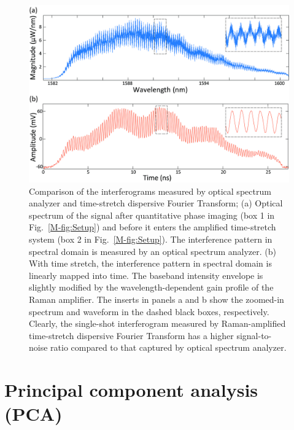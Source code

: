 \documentclass[aps,pra,reprint,longbibliography,groupedaddress]{revtex4-1}
\begin{document}
\begin{figure}
\includegraphics[scale=0.9]{FigureOSA.jpg}
\caption{\label{fig:OSA} Comparison of the interferograms measured by optical spectrum analyzer and time-stretch dispersive Fourier Transform; (a) Optical spectrum of the signal after quantitative phase imaging (box 1 in Fig.~\ref{M-fig:Setup}) and before it enters the amplified time-stretch system (box 2 in Fig.~\ref{M-fig:Setup}). The interference pattern in spectral domain is measured by an optical spectrum analyzer. (b) With time stretch, the interference pattern in spectral domain is linearly mapped into time. The baseband intensity envelope is slightly modified by the wavelength-dependent gain profile of the Raman amplifier. The inserts in panels a and b show the zoomed-in spectrum and waveform in the dashed black boxes, respectively. Clearly, the single-shot interferogram measured by Raman-amplified time-stretch dispersive Fourier Transform has a higher signal-to-noise ratio compared to that captured by optical spectrum analyzer.}
\end{figure}

\section{Principal component analysis (PCA)}
\end{document}
